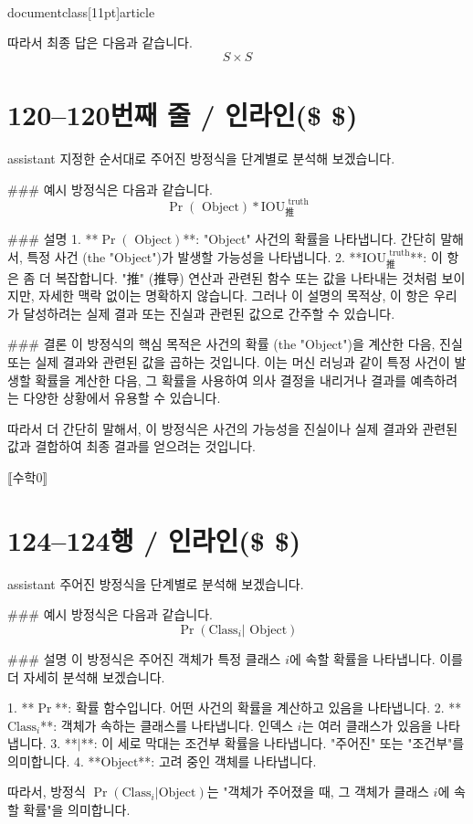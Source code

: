 \\documentclass[11pt]{article}
\begin{document}
따라서 최종 답은 다음과 같습니다.
\[ \boxed{S \times S} \]

\section*{120–120번째 줄 / 인라인(\$ \$) }
assistant
지정한 순서대로 주어진 방정식을 단계별로 분석해 보겠습니다.

### 예시
방정식은 다음과 같습니다.
\[
\Pr(\textrm{ Object}) * \textrm{IOU}_{\textrm{推}}^{\textrm{ truth}}
\]

### 설명
1. **\(\Pr(\textrm{ Object})\)**: "Object" 사건의 확률을 나타냅니다. 간단히 말해서, 특정 사건 (the "Object")가 발생할 가능성을 나타냅니다.
2. **\(\textrm{IOU}_{\textrm{推}}^{\textrm{ truth}}\)**: 이 항은 좀 더 복잡합니다. "推" (推导) 연산과 관련된 함수 또는 값을 나타내는 것처럼 보이지만, 자세한 맥락 없이는 명확하지 않습니다. 그러나 이 설명의 목적상, 이 항은 우리가 달성하려는 실제 결과 또는 진실과 관련된 값으로 간주할 수 있습니다.

### 결론
이 방정식의 핵심 목적은 사건의 확률 (the "Object")을 계산한 다음, 진실 또는 실제 결과와 관련된 값을 곱하는 것입니다. 이는 머신 러닝과 같이 특정 사건이 발생할 확률을 계산한 다음, 그 확률을 사용하여 의사 결정을 내리거나 결과를 예측하려는 다양한 상황에서 유용할 수 있습니다.

따라서 더 간단히 말해서, 이 방정식은 사건의 가능성을 진실이나 실제 결과와 관련된 값과 결합하여 최종 결과를 얻으려는 것입니다.

⟦수학0⟧

\section*{124–124행 / 인라인(\$ \$) }
assistant
주어진 방정식을 단계별로 분석해 보겠습니다.

### 예시
방정식은 다음과 같습니다.
\[
\Pr(\textrm{Class}_i | \textrm{ Object})
\]

### 설명
이 방정식은 주어진 객체가 특정 클래스 \(i\)에 속할 확률을 나타냅니다. 이를 더 자세히 분석해 보겠습니다.

1. **\(\Pr\)**: 확률 함수입니다. 어떤 사건의 확률을 계산하고 있음을 나타냅니다.
2. **\(\textrm{Class}_i\)**: 객체가 속하는 클래스를 나타냅니다. 인덱스 \(i\)는 여러 클래스가 있음을 나타냅니다.
3. **\(|\)**: 이 세로 막대는 조건부 확률을 나타냅니다. "주어진" 또는 "조건부"를 의미합니다.
4. **\(\textrm{Object}\)**: 고려 중인 객체를 나타냅니다.

따라서, 방정식 \(\Pr(\textrm{Class}_i | \textrm{Object})\)는 "객체가 주어졌을 때, 그 객체가 클래스 \(i\)에 속할 확률"을 의미합니다.
\end{document}
